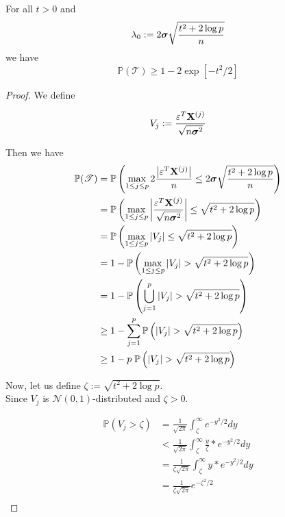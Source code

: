 \begin{lemma}[Lemma 6.2.]
    For all $t > 0$ and
    $$\lambda_{0}:=2 \boldsymbol{\sigma} \sqrt{\frac{t^{2}+2 \log p}{n}}$$
    we have
    $$\mathbb{P}(\mathscr{T}) \geq 1-2 \exp \left[-t^{2} / 2\right]$$
\end{lemma}
\begin{proof}
    We define

    $$
        V_{j} := \frac{\varepsilon^{T} \mathbf{X}^{(j)}}{\sqrt{n \boldsymbol{\sigma}^{2}}}
    $$

    Then we have
    \begin{align}
        \nonumber
        \mathbb{P}(\mathscr{T})
         & = \mathbb{P} \left( \max _{1 \leq j \leq p} 2 \frac{\left| \varepsilon^{T} \mathbf{X}^{(j)}\right|}{n} \leq 2 \boldsymbol{\sigma} \sqrt{\frac{t^{2}+2 \log p}{n}}  \right) \\
        \nonumber
         & =
        \mathbb{P} \left( \max _{1 \leq j \leq p} \left| \frac{\varepsilon^{T} \mathbf{X}^{(j)}}{\sqrt{n \boldsymbol{\sigma}^{2}}} \right| \leq \sqrt{t^{2}+2 \log p}  \right)        \\
        \nonumber
         & =
        \mathbb{P} \left( \max _{1 \leq j \leq p} | V_{j} | \leq \sqrt{t^{2}+2 \log p}  \right)                                                                        \\
        \nonumber
         & = 1 - \mathbb{P} \left( \max _{1 \leq j \leq p} | V_{j} | > \sqrt{t^{2}+2 \log p}  \right)                                                                  \\
        \nonumber
         & = 1 - \mathbb{P} \left( \bigcup_{j = 1}^{p} | V_{j} | > \sqrt{t^{2}+2 \log p}  \right)                                                                      \\
        \nonumber
         & \geq 1 - \sum_{j = 1}^{p} \mathbb{P} \left( | V_{j} | > \sqrt{t^{2}+2 \log p}  \right)                                                                      \\
        \label{eqn: proof lemma 6.2.}
         & \geq 1 - p \; \mathbb{P} \left( | V_{j} | > \sqrt{t^{2}+2 \log p}  \right)
    \end{align}

    Now, let us define $\zeta := \sqrt{t^{2}+2 \log p}$. \\
    Since $V_j$ is $\mathscr{N} (0,1)$-distributed and $\zeta > 0$.

    \begin{align*}
        \mathbb{P}(V_j > \zeta) & = \frac{1}{\sqrt{2\pi}} \int_\zeta^{\infty} e^{-y^2/2} dy                     \\
                                & < \frac{1}{\sqrt{2\pi}} \int_\zeta^{\infty} \frac{y}{\zeta} * e^{-y^2 / 2} dy \\
                                & = \frac{1}{\zeta \sqrt{2\pi}} \int_\zeta^{\infty} y * e^{-y^2 / 2} dy         \\
                                & = \frac{1}{\zeta\sqrt{2\pi}} e^{-\zeta^2/2}                                   \\
    \end{align*}


\end{proof}
